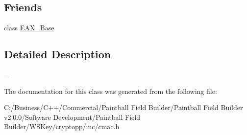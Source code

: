 \subsection*{Friends}
\begin{DoxyCompactItemize}
\item 
\hypertarget{class_c_m_a_c___base_a338517a88999d41d9f0cf9fdfc04143a}{
class \hyperlink{class_c_m_a_c___base_a338517a88999d41d9f0cf9fdfc04143a}{EAX\_\-Base}}
\label{class_c_m_a_c___base_a338517a88999d41d9f0cf9fdfc04143a}

\end{DoxyCompactItemize}


\subsection{Detailed Description}
\_\- 

The documentation for this class was generated from the following file:\begin{DoxyCompactItemize}
\item 
C:/Business/C++/Commercial/Paintball Field Builder/Paintball Field Builder v2.0.0/Software Development/Paintball Field Builder/WSKey/cryptopp/inc/cmac.h\end{DoxyCompactItemize}
